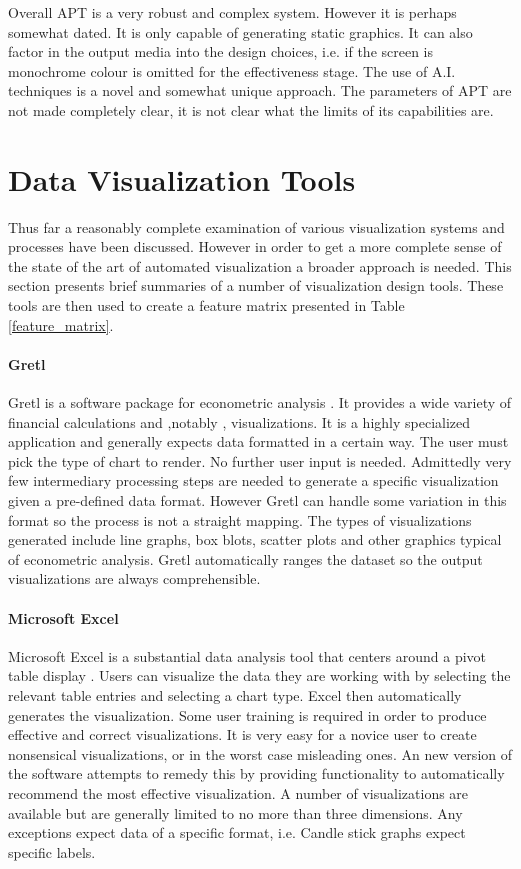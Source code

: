 \documentclass[a4paper, 11pt, titlepage, onehalfspacing]{report}
\begin{document}
Overall APT is a very robust and complex system. However it is perhaps somewhat dated. It is only capable of generating static graphics. It can also factor in the output media into the design choices, i.e. if the screen is monochrome colour is omitted for the effectiveness stage. The use of A.I. techniques is a novel and somewhat unique approach. The parameters of APT are not made completely clear, it is not clear what the limits of its capabilities are.

\section{Data Visualization Tools}
\label{viz_tools}
Thus far a reasonably complete examination of various visualization systems and processes have been discussed. However in order to get a more complete sense of the state of the art of automated visualization a broader approach is needed. This section presents brief summaries of a number of visualization design tools. These tools are then used to create a feature matrix presented in Table \ref{feature_matrix}.

\paragraph{Gretl}
Gretl is a software package for econometric analysis \cite{gretl}. It provides a wide variety of financial calculations and ,notably , visualizations. It is a highly specialized application and generally expects data formatted in a certain way. The user must pick the type of chart to render. No further user input is needed. Admittedly very few intermediary processing steps are needed to generate a specific visualization given a pre-defined data format. However Gretl can handle some variation in this format so the process is not a straight mapping. The types of visualizations generated include line graphs, box blots, scatter plots and other graphics typical of econometric analysis. Gretl automatically ranges the dataset so the output visualizations are always comprehensible.

\paragraph{Microsoft Excel}
Microsoft Excel is a substantial data analysis tool that centers around a pivot table display \cite{excel}. Users can visualize the data they are working with by selecting the relevant table entries and selecting a chart type. Excel then automatically generates the visualization. Some user training is required in order to produce effective and correct visualizations. It is very easy for a novice user to create nonsensical visualizations, or in the worst case misleading ones. An new version of the software attempts to remedy this by providing functionality to automatically recommend the most effective visualization. A number of visualizations are available but are generally limited to no more than three dimensions. Any exceptions expect data of a specific format, i.e. Candle stick graphs expect specific labels.
\end{document}
